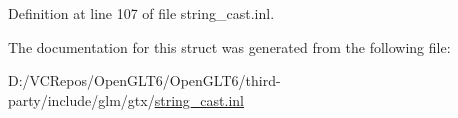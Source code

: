 Definition at line 107 of file string\+\_\+cast.\+inl.



The documentation for this struct was generated from the following file\+:\begin{DoxyCompactItemize}
\item 
D\+:/\+V\+C\+Repos/\+Open\+G\+L\+T6/\+Open\+G\+L\+T6/third-\/party/include/glm/gtx/\mbox{\hyperlink{string__cast_8inl}{string\+\_\+cast.\+inl}}\end{DoxyCompactItemize}
